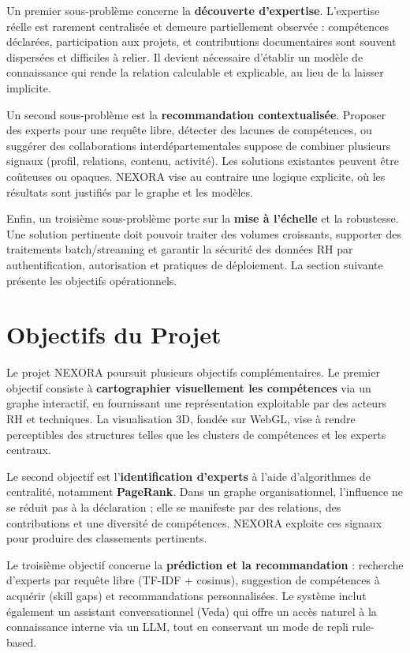 \documentclass[12pt,a4paper]{report}
\begin{document}
Un premier sous-problème concerne la \textbf{découverte d'expertise}. L'expertise réelle est rarement centralisée et demeure partiellement observée : compétences déclarées, participation aux projets, et contributions documentaires sont souvent dispersées et difficiles à relier. Il devient nécessaire d'établir un modèle de connaissance qui rende la relation calculable et explicable, au lieu de la laisser implicite.

Un second sous-problème est la \textbf{recommandation contextualisée}. Proposer des experts pour une requête libre, détecter des lacunes de compétences, ou suggérer des collaborations interdépartementales suppose de combiner plusieurs signaux (profil, relations, contenu, activité). Les solutions existantes peuvent être coûteuses ou opaques. NEXORA vise au contraire une logique explicite, où les résultats sont justifiés par le graphe et les modèles.

Enfin, un troisième sous-problème porte sur la \textbf{mise à l'échelle} et la robustesse. Une solution pertinente doit pouvoir traiter des volumes croissants, supporter des traitements batch/streaming et garantir la sécurité des données RH par authentification, autorisation et pratiques de déploiement. La section suivante présente les objectifs opérationnels.

\section{Objectifs du Projet}
Le projet NEXORA poursuit plusieurs objectifs complémentaires. Le premier objectif consiste à \textbf{cartographier visuellement les compétences} via un graphe interactif, en fournissant une représentation exploitable par des acteurs RH et techniques. La visualisation 3D, fondée sur WebGL, vise à rendre perceptibles des structures telles que les clusters de compétences et les experts centraux.

Le second objectif est l'\textbf{identification d'experts} à l'aide d'algorithmes de centralité, notamment \textbf{PageRank}. Dans un graphe organisationnel, l'influence ne se réduit pas à la déclaration ; elle se manifeste par des relations, des contributions et une diversité de compétences. NEXORA exploite ces signaux pour produire des classements pertinents.

Le troisième objectif concerne la \textbf{prédiction et la recommandation} : recherche d'experts par requête libre (TF-IDF + cosinus), suggestion de compétences à acquérir (skill gaps) et recommandations personnalisées. Le système inclut également un assistant conversationnel (Veda) qui offre un accès naturel à la connaissance interne via un LLM, tout en conservant un mode de repli rule-based.
\end{document}
